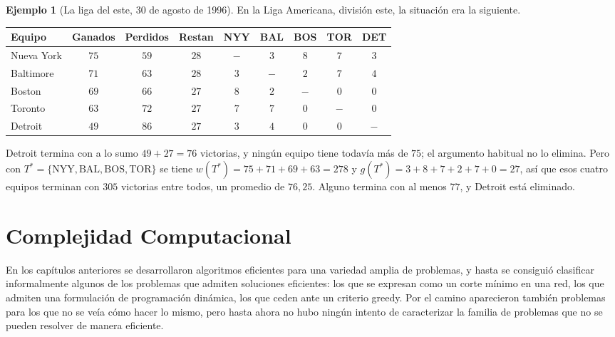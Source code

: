 \documentclass[12pt, spanish, oneside, openany]{book}
\theoremstyle{uprightplain}
\theoremstyle{definition}
\newtheorem{ejemplo}[teorema]{Ejemplo}
\theoremstyle{remark}
\theoremstyle{definition}
\begin{document}
\begin{ejemplo}[La liga del este, 30 de agosto de 1996]
\label{ej:flujo-detroit}
En la Liga Americana, división este, la situación era la siguiente.
\begin{center}
\small
\renewcommand{\arraystretch}{1.15}
\begin{tabular}{@{}lcccccccc@{}}
\toprule
\textbf{Equipo} & \textbf{Ganados} & \textbf{Perdidos} & \textbf{Restan} & \textbf{NYY} & \textbf{BAL} & \textbf{BOS} & \textbf{TOR} & \textbf{DET}\\
\midrule
Nueva York & $75$ & $59$ & $28$ & $-$ & $3$ & $8$ & $7$ & $3$\\
Baltimore  & $71$ & $63$ & $28$ & $3$ & $-$ & $2$ & $7$ & $4$\\
Boston     & $69$ & $66$ & $27$ & $8$ & $2$ & $-$ & $0$ & $0$\\
Toronto    & $63$ & $72$ & $27$ & $7$ & $7$ & $0$ & $-$ & $0$\\
Detroit    & $49$ & $86$ & $27$ & $3$ & $4$ & $0$ & $0$ & $-$\\
\bottomrule
\end{tabular}
\end{center}
Detroit termina con a lo sumo $49+27=76$ victorias, y ningún equipo tiene todavía más de $75$; el argumento habitual no lo elimina. Pero con $T^{*}=\{\text{NYY},\text{BAL},\text{BOS},\text{TOR}\}$ se tiene $w(T^{*})=75+71+69+63=278$ y $g(T^{*})=3+8+7+2+7+0=27$, así que esos cuatro equipos terminan con $305$ victorias entre todos, un promedio de $76{,}25$. Alguno termina con al menos $77$, y Detroit está eliminado.
\end{ejemplo}



\chapter{Complejidad Computacional}
\label{chap:complejidad}

En los capítulos anteriores se desarrollaron algoritmos eficientes para una variedad amplia de problemas, y hasta se consiguió clasificar informalmente algunos de los problemas que admiten soluciones eficientes: los que se expresan como un corte mínimo en una red, los que admiten una formulación de programación dinámica, los que ceden ante un criterio greedy. Por el camino aparecieron también problemas para los que no se veía cómo hacer lo mismo, pero hasta ahora no hubo ningún intento de caracterizar la familia de problemas que no se pueden resolver de manera eficiente.
\end{document}
